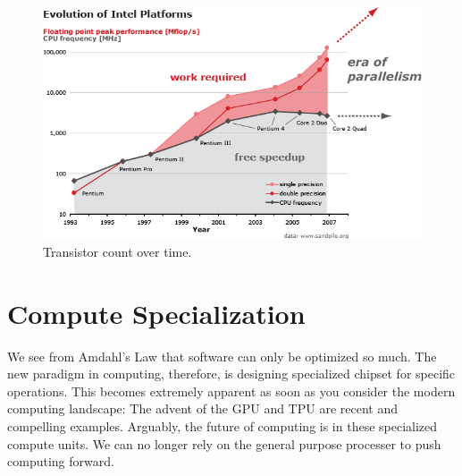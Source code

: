 \documentclass[12pt]{article}
\begin{document}
\begin{figure}[h]
    \centering
    \includegraphics[width=1\textwidth]{amdahls.png}
    \caption{Transistor count over time.}
\end{figure}

\section*{Compute Specialization}

We see from Amdahl's Law that software can only be optimized so much. The new paradigm in computing, therefore, is designing specialized chipset for specific operations. This becomes extremely apparent as soon as you consider the modern computing landscape: The advent of the GPU and TPU are recent and compelling examples. Arguably, the future of computing is in these specialized compute units. We can no longer rely on the general purpose processer to push computing forward.
\end{document}

